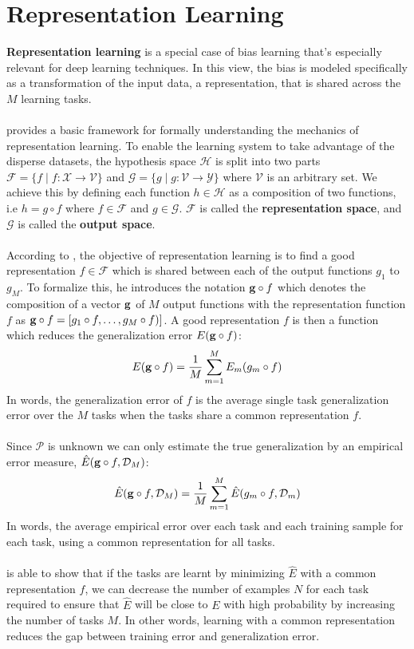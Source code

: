 \section{Representation Learning}
\label{representation_learning}
\textbf{Representation learning} is a special case of bias learning that's especially relevant for deep learning techniques. In this view, the bias is modeled specifically as a transformation of the input data, a representation, that is shared across the $M$ learning tasks.
\\\\
\citet{baxter1995} provides a basic framework for formally understanding the mechanics of representation learning. To enable the learning system to take advantage of the disperse datasets, the hypothesis space $\mathcal{H}$ is split into two parts $\mathcal{F} = \{f \mid f: \mathcal{X} \to \mathcal{V}\}$ and $\mathcal{G} = \{g \mid g: \mathcal{V} \to \mathcal{Y} \}$ where $\mathcal{V}$ is an arbitrary set. We achieve this by defining each function $h \in \mathcal{H}$ as a composition of two functions, i.e $h = g \circ f$ where $f \in \mathcal{F}$ and $g \in \mathcal{G}$. $\mathcal{F}$ is called the \textbf{representation space}, and $\mathcal{G}$ is called the \textbf{output space}.
\\\\
According to \citet{baxter2000}, the objective of representation learning is to find a good representation $f \in \mathcal{F}$ which is shared between each of the output functions $g_1$ to $g_M$. To formalize this, he introduces the notation $\mathbf{g} \circ f$ which denotes the composition of a vector $\mathbf{g}$ of $M$ output functions with the representation function $f$ as $\mathbf{g} \circ f = [g_1 \circ f, \dots, g_M \circ f)]$. A good representation $f$ is then a function which reduces the generalization error $E(\mathbf{g} \circ f)$:
$$
E(\mathbf{g} \circ f) = \frac{1}{M}\sum\limits_{m = 1}^M E_m(g_m \circ f)
$$
In words, the generalization error of $f$ is the average single task generalization error over the $M$ tasks when the tasks share a common representation $f$.
\\\\
Since $\mathcal{P}$ is unknown we can only estimate the true generalization by an empirical error measure, $\hat{E}(\mathbf{g} \circ f,\mathcal{D}_M)$:
$$
\hat{E}(\mathbf{g} \circ f,\mathcal{D}_M) = \frac{1}{M} \sum\limits_{m = 1}^M \hat{E}(g_m \circ f, \mathcal{D}_m)
$$
In words, the average empirical error over each task and each training sample for each task, using a common representation for all tasks.
\\\\
\citet{baxter1995} is able to show that if the tasks are learnt by minimizing $\hat{E}$ with a common representation $f$, we can decrease the number of examples $N$ for each task required to ensure that $\hat{E}$ will be close to $E$ with high probability by increasing the number of tasks $M$. In other words, learning with a common representation reduces the gap between training error and generalization error.

